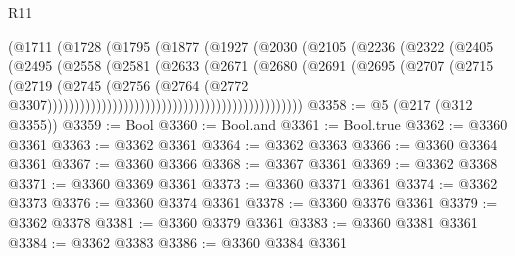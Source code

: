 \begin{lexlean}{R11}
\begin{coremodule}
                                                (@1711
                                                  (@1728
                                                    (@1795
                                                      (@1877
                                                        (@1927
                                                          (@2030
                                                            (@2105
                                                              (@2236
                                                                (@2322
                                                                  (@2405
                                                                    (@2495
                                                                      (@2558
                                                                        (@2581
                                                                          (@2633
                                                                            (@2671
                                                                              (@2680
                                                                                (@2691
                                                                                  (@2695
                                                                                    (@2707
                                                                                      (@2715
                                                                                        (@2719
                                                                                          (@2745
                                                                                            (@2756
                                                                                              (@2764
                                                                                                (@2772
                                                                                                  @3307)))))))))))))))))))))))))))))))))))))))))))))))
@3358 := @5 (@217 (@312 @3355))
@3359 := Bool
@3360 := Bool.and
@3361 := Bool.true
@3362 := @3360 @3361
@3363 := @3362 @3361
@3364 := @3362 @3363
@3366 := @3360 @3364 @3361
@3367 := @3360 @3366
@3368 := @3367 @3361
@3369 := @3362 @3368
@3371 := @3360 @3369 @3361
@3373 := @3360 @3371 @3361
@3374 := @3362 @3373
@3376 := @3360 @3374 @3361
@3378 := @3360 @3376 @3361
@3379 := @3362 @3378
@3381 := @3360 @3379 @3361
@3383 := @3360 @3381 @3361
@3384 := @3362 @3383
@3386 := @3360 @3384 @3361

\end{coremodule}
\end{lexlean}
